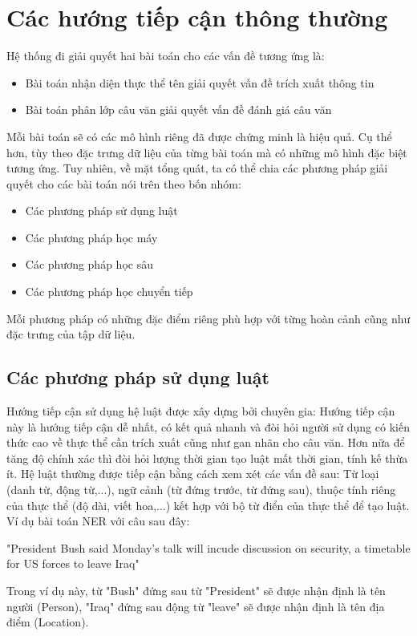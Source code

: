 \documentclass[14pt]{extreport}
\begin{document}
\section {Các hướng tiếp cận thông thường}
Hệ thống đi giải quyết hai bài toán cho các vấn đề tương ứng là:
\begin{itemize}
    \item Bài toán nhận diện thực thể tên giải quyết vấn đề trích xuất thông tin
    \item Bài toán phân lớp câu văn giải quyết vấn đề đánh giá câu văn
\end{itemize}
Mỗi bài toán sẽ có các mô hình riêng đã được chứng minh là hiệu quả. Cụ thể hơn, tùy theo đặc trưng dữ liệu của từng bài toán mà có những mô hình đặc biệt tương ứng. Tuy nhiên, về mặt tổng quát, ta có thể chia các phương pháp giải quyết cho các bài toán nói trên theo bốn nhóm:
\begin{itemize}
    \item Các phương pháp sử dụng luật
    \item Các phương pháp học máy
    \item Các phương pháp học sâu
    \item Các phương pháp học chuyển tiếp
\end{itemize}
Mỗi phương pháp có những đặc điểm riêng phù hợp với từng hoàn cảnh cũng như đặc trưng của tập dữ liệu.

\subsection{Các phương pháp sử dụng luật}
Hướng tiếp cận sử dụng hệ luật được xây dựng bởi chuyên gia: Hướng tiếp cận này là hướng tiếp cận dễ nhất, có kết quả nhanh và đòi hỏi người sử dụng có kiến thức cao về thực thể cần trích xuất cũng như gan nhãn cho câu văn. Hơn nữa để tăng độ chính xác thì đòi hỏi lượng thời gian tạo luật mất thời gian, tính kế thừa ít. Hệ luật thường được tiếp cận bằng cách xem xét các vấn đề sau: Từ loại (danh từ, động từ,...), ngữ cảnh (từ đứng trước, từ đứng sau), thuộc tính riêng của thực thể (độ dài, viết hoa,...) kết hợp với bộ từ điển của thực thể để tạo luật. Ví dụ bài toán NER với câu sau đây: 
    \begin{displayquote}
    "President Bush said Monday's talk will incude discussion on security, a timetable for US forces to leave Iraq"
    \end{displayquote}
    Trong ví dụ này, từ "Bush" đứng sau từ "President" sẽ được nhận định là tên người (Person), "Iraq" đứng sau động từ "leave" sẽ được nhận định là tên địa điểm (Location).
    
\end{document}
